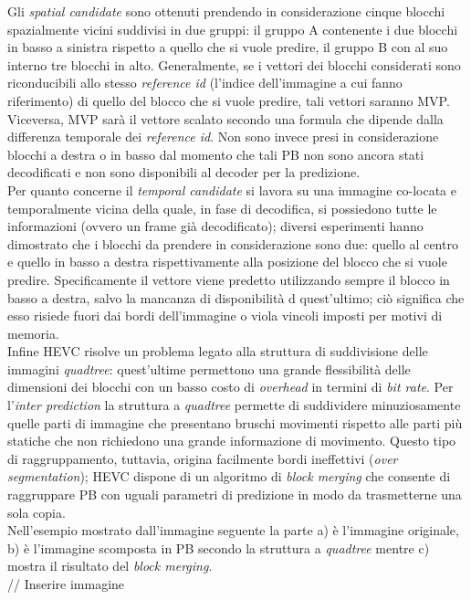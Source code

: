 Gli \emph{spatial candidate} sono ottenuti prendendo in considerazione cinque 
blocchi spazialmente vicini suddivisi in due gruppi: il gruppo A contenente i 
due blocchi in basso a sinistra rispetto a quello che si vuole predire, il 
gruppo B con al suo interno tre blocchi in alto.
Generalmente, se i vettori dei blocchi considerati sono riconducibili allo 
stesso \emph{reference id} (l'indice dell'immagine a cui fanno 
riferimento) di quello del blocco che si vuole predire, tali vettori saranno 
MVP.
Viceversa, MVP sarà il vettore scalato secondo una formula che dipende dalla 
differenza temporale dei \emph{reference id}.
Non sono invece presi in considerazione blocchi a destra o in basso dal 
momento che tali PB non sono ancora stati decodificati e non sono disponibili 
al decoder per la predizione.
\\
Per quanto concerne il \emph{temporal candidate} si lavora su una immagine 
co-locata e temporalmente vicina della quale, in fase di decodifica, si 
possiedono tutte le informazioni (ovvero un frame già decodificato); diversi 
esperimenti hanno dimostrato che i blocchi da prendere in considerazione sono 
due: quello al centro e quello in basso a destra rispettivamente alla posizione 
del blocco che si vuole predire.
Specificamente il vettore viene predetto utilizzando sempre il blocco in basso 
a destra, salvo la mancanza di disponibilità d quest'ultimo; ciò significa che 
esso risiede fuori dai bordi dell'immagine o viola vincoli imposti per motivi 
di memoria.
\newline \\
Infine HEVC risolve un problema legato alla struttura di suddivisione delle 
immagini \emph{quadtree}: quest'ultime permettono una grande flessibilità 
delle dimensioni dei blocchi con un basso costo di \emph{overhead} in termini 
di \emph{bit rate}. Per l'\emph{inter prediction} la struttura a \emph{quadtree}
 permette di suddividere minuziosamente quelle parti di immagine che presentano 
bruschi movimenti rispetto alle parti più statiche che non richiedono una 
grande informazione di movimento. Questo tipo di raggruppamento, tuttavia, 
origina facilmente bordi ineffettivi (\emph{over segmentation}); HEVC dispone 
di un  algoritmo di \emph{block merging} che consente di raggruppare PB con 
uguali parametri di predizione in modo da trasmetterne una sola copia.
\\
Nell'esempio mostrato dall'immagine seguente la parte a) è l'immagine 
originale, b) è l'immagine scomposta in PB secondo la struttura a 
\emph{quadtree} mentre c) mostra il risultato del \emph{block merging}.
\\
// Inserire immagine 
\\

